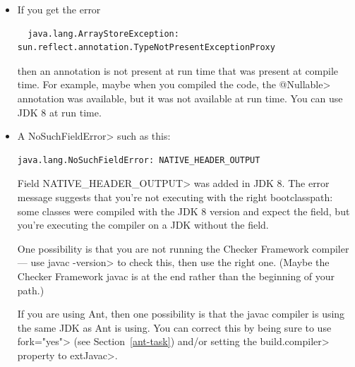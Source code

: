 \begin{itemize}
\begin{alltt}
The hierarchy of the type \emph{ClassName} is inconsistent

The type com.sun.source.util.AbstractTypeProcessor cannot be resolved.
  It is indirectly referenced from required .class files
\end{alltt}

\begin{sloppypar}
\noindent
then you are likely \textbf{not} using the Checker Framework compiler.  Use
either  or one of the alternatives
described in Section~\ref{javac-wrapper}.
\end{sloppypar}


\item
If you get the error

\begin{Verbatim}
  java.lang.ArrayStoreException: sun.reflect.annotation.TypeNotPresentExceptionProxy
\end{Verbatim}

\noindent
then an annotation is not present at run time that was present at compile
time.  For example, maybe when you compiled the code, the \<@Nullable>
annotation was available, but it was not available at run time.
You can use JDK 8 at run time.

\item
\label{no-such-field-error}
A \<NoSuchFieldError> such as this:

\begin{Verbatim}
java.lang.NoSuchFieldError: NATIVE_HEADER_OUTPUT
\end{Verbatim}

\noindent
Field \<NATIVE\_HEADER\_OUTPUT> was added in JDK 8.
The error message suggests that
you're not executing with the right bootclasspath: some classes were
compiled with the JDK 8 version and expect the field, but you're
executing the compiler on a JDK without the field.

One possibility is that you are not running the Checker Framework compiler
--- use \<javac -version> to check this, then use the right one.  (Maybe
the Checker Framework javac is at the end rather than the beginning of your
path.)

If you are using Ant, then one possibility
is that the javac compiler is using the same JDK as Ant is using.  You can
correct this by being sure to use \<fork="yes"> (see
Section~\ref{ant-task}) and/or setting the \<build.compiler> property to
\<extJavac>.


\end{itemize}
